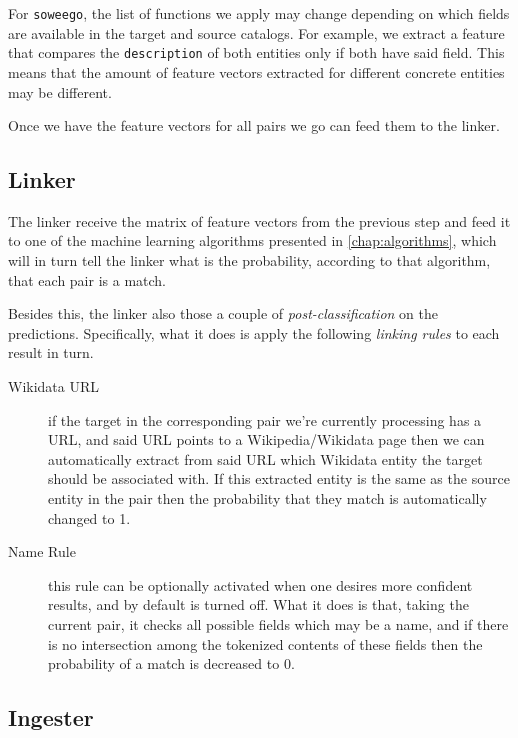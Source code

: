 \documentclass[epsfig,a4paper,11pt,titlepage,twoside,openany]{book}
\begin{document}
For \texttt{soweego}, the list of functions we apply may change depending on which fields are available in the target and source catalogs. For example, we extract a feature that compares the \texttt{description} of both entities only if both have said field. This means that the amount of feature vectors extracted for different concrete entities may be different. 

Once we have the feature vectors for all pairs we go can feed them to the linker. 


\subsection{Linker}
\label{sec:soweego-st-linker}

The linker receive the matrix of feature vectors from the previous step and feed it to one of the machine learning algorithms presented in \autoref{chap:algorithms}, which will in turn tell the linker what is the probability, according to that algorithm, that each pair is a match.

Besides this, the linker also those a couple of \textit{post-classification} on the predictions. Specifically, what it does is apply the following \textit{linking rules} to each result in turn.

\begin{description}
\item[Wikidata URL] if the target in the corresponding pair we're currently processing has a URL, and said URL points to a Wikipedia/Wikidata page then we can automatically extract from said URL which Wikidata entity the target should be associated with. If this extracted entity is the same as the source entity in the pair then the probability that they match is automatically changed to 1. 

\item[Name Rule] this rule can be optionally activated when one desires more confident results, and by default is turned off. What it does is that, taking the current pair, it checks all possible fields which may be a name, and if there is no intersection among the tokenized contents of these fields then the probability of a match is decreased to 0.
\end{description}



\subsection{Ingester}
\label{sec:soweego-st-ingester}
\end{document}
